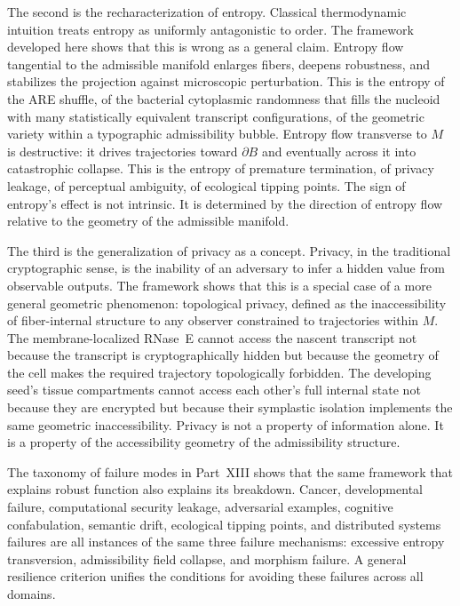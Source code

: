 \documentclass[12pt, a4paper]{article}
\theoremstyle{essaystyle}
\begin{document}
The second is the recharacterization of entropy. Classical thermodynamic intuition
treats entropy as uniformly antagonistic to order. The framework developed here
shows that this is wrong as a general claim. Entropy flow tangential to the
admissible manifold enlarges fibers, deepens robustness, and stabilizes the
projection against microscopic perturbation. This is the entropy of the ARE shuffle,
of the bacterial cytoplasmic randomness that fills the nucleoid with many statistically
equivalent transcript configurations, of the geometric variety within a typographic
admissibility bubble. Entropy flow transverse to $M$ is destructive: it drives
trajectories toward $\partial B$ and eventually across it into catastrophic collapse.
This is the entropy of premature termination, of privacy leakage, of perceptual
ambiguity, of ecological tipping points. The sign of entropy's effect is not
intrinsic. It is determined by the direction of entropy flow relative to the geometry
of the admissible manifold.

The third is the generalization of privacy as a concept. Privacy, in the traditional
cryptographic sense, is the inability of an adversary to infer a hidden value from
observable outputs. The framework shows that this is a special case of a more general
geometric phenomenon: topological privacy, defined as the inaccessibility of
fiber-internal structure to any observer constrained to trajectories within $M$.
The membrane-localized RNase~E cannot access the nascent transcript not because the
transcript is cryptographically hidden but because the geometry of the cell makes
the required trajectory topologically forbidden. The developing seed's tissue
compartments cannot access each other's full internal state not because they are
encrypted but because their symplastic isolation implements the same geometric
inaccessibility. Privacy is not a property of information alone. It is a property
of the accessibility geometry of the admissibility structure.

The taxonomy of failure modes in Part~XIII shows that the same framework that
explains robust function also explains its breakdown. Cancer, developmental failure,
computational security leakage, adversarial examples, cognitive confabulation,
semantic drift, ecological tipping points, and distributed systems failures are all
instances of the same three failure mechanisms: excessive entropy transversion,
admissibility field collapse, and morphism failure. A general resilience criterion
unifies the conditions for avoiding these failures across all domains.
\end{document}
